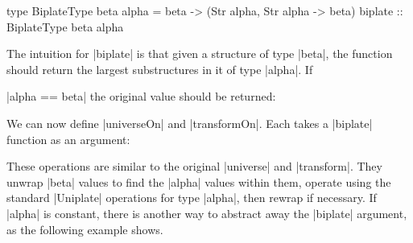 \begin{comment}
\begin{code}
type BiplateType beta alpha = beta -> (Str alpha, Str alpha -> beta)
\end{code}
\end{comment}

\begin{code}
type BiplateType beta alpha = beta -> (Str alpha, Str alpha -> beta)
biplate :: BiplateType beta alpha
\end{code}

The intuition for |biplate| is that given a structure of type |beta|, the function should return the largest substructures in it of type |alpha|. If \ignore|alpha == beta| the original value should be returned:


We can now define |universeOn| and |transformOn|. Each takes a |biplate| function as an argument:


These operations are similar to the original |universe| and |transform|. They unwrap |beta| values to find the |alpha| values within them, operate using the standard |Uniplate| operations for type |alpha|, then rewrap if necessary. If |alpha| is constant, there is another way to abstract away the |biplate| argument, as the following example shows.

